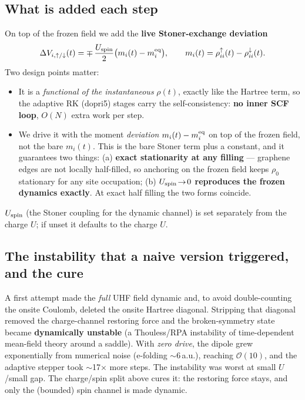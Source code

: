 \documentclass[11pt]{article}
\begin{document}
\subsection{What is added each step}
On top of the frozen field we add the \textbf{live Stoner-exchange deviation}
\begin{equation}
\Delta V_{i,\uparrow/\downarrow}(t)=\mp\,\frac{U_{\rm spin}}{2}
\big(m_i(t)-m_i^{\rm eq}\big),\qquad
m_i(t)=\rho_{ii}^{\uparrow}(t)-\rho_{ii}^{\downarrow}(t).
\label{eq:stoner}
\end{equation}
Two design points matter:
\begin{itemize}
\item It is a \emph{functional of the instantaneous} $\rho(t)$, exactly like the
Hartree term, so the adaptive RK (dopri5) stages carry the self-consistency:
\textbf{no inner SCF loop}, $O(N)$ extra work per step.
\item We drive it with the moment \emph{deviation} $m_i(t)-m_i^{\rm eq}$ on top
of the frozen field, not the bare $m_i(t)$. This is the bare Stoner term plus a
constant, and it guarantees two things:
(a) \textbf{exact stationarity at any filling} --- graphene edges are not locally
half-filled, so anchoring on the frozen field keeps $\rho_0$ stationary for any
site occupation; (b) \textbf{$U_{\rm spin}\!\to\!0$ reproduces the frozen
dynamics exactly}. At exact half filling the two forms coincide.
\end{itemize}
$U_{\rm spin}$ (the Stoner coupling for the dynamic channel) is set separately
from the charge $U$; if unset it defaults to the charge $U$.

\subsection{The instability that a naive version triggered, and the cure}
A first attempt made the \emph{full} UHF field dynamic and, to avoid
double-counting the onsite Coulomb, deleted the onsite Hartree diagonal.
Stripping that diagonal removed the charge-channel restoring force and the
broken-symmetry state became \textbf{dynamically unstable} (a Thouless/RPA
instability of time-dependent mean-field theory around a saddle). With
\emph{zero drive}, the dipole grew exponentially from numerical noise
(e-folding $\sim 6$\,a.u.), reaching $\mathcal{O}(10)$, and the adaptive stepper
took $\sim$17$\times$ more steps. The instability was worst at small
$U$/small gap. The charge/spin split above cures it: the restoring force stays,
and only the (bounded) spin channel is made dynamic.
\end{document}
